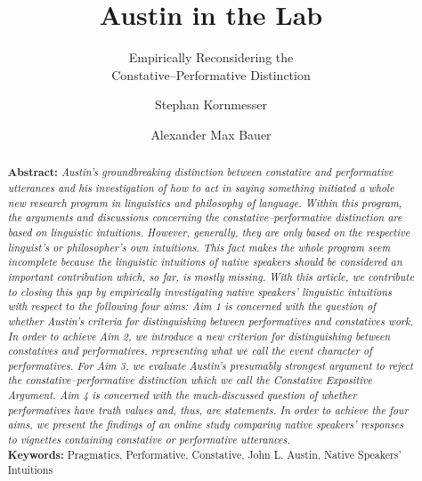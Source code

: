 \documentclass[egregdoesnotlikesansseriftitles,12pt]{scrartcl}
\title{Austin in the Lab}
\subtitle{Empirically Reconsidering the\\Constative--Performative Distinction}
\author[1*]{Stephan Kornmesser}
\author[1]{Alexander Max Bauer}
\affil[1]{ Department of Philosophy, University of Oldenburg, Germany}
\affil[*]{ Corresponding Author, E-Mail: \href{mailto:stephan.kornmesser@uni-oldenburg.de}{stephan.kornmesser@uni-oldenburg.de}}
\date{}
\begin{document}
\maketitle

\vspace{\fill}
\begin{abstract}
   \noindent\textbf{Abstract:} \textit{Austin's groundbreaking distinction between constative and performative utterances and his investigation of how to act in saying something initiated a whole new research program in linguistics and philosophy of language. Within this program, the arguments and discussions concerning the constative--performative distinction are based on linguistic intuitions. However, generally, they are only based on the respective linguist's or philosopher's own intuitions. This fact makes the whole program seem incomplete because the linguistic intuitions of native speakers should be considered an important contribution which, so far, is mostly missing. With this article, we contribute to closing this gap by empirically investigating native speakers' linguistic intuitions with respect to the following four aims: Aim 1 is concerned with the question of whether Austin's criteria for distinguishing between performatives and constatives work. In order to achieve Aim 2, we introduce a new criterion for distinguishing between constatives and performatives, representing what we call the event character of performatives. For Aim 3, we evaluate Austin's presumably strongest argument to reject the constative--performative distinction which we call the Constative Expositive Argument. Aim 4 is concerned with the much-discussed question of whether performatives have truth values and, thus, are statements. In order to achieve the four aims, we present the findings of an online study comparing native speakers' responses to vignettes containing constative or performative utterances.}\\[2ex]
   \textbf{Keywords:} Pragmatics, Performative, Constative, John L. Austin, Native Speakers' Intuitions
\end{abstract}


\clearpage
\end{document}
